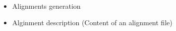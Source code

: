 \begin{itemize}
	\item Alignments generation
	\item Alginment description (Content of an alignment file)
\end{itemize}